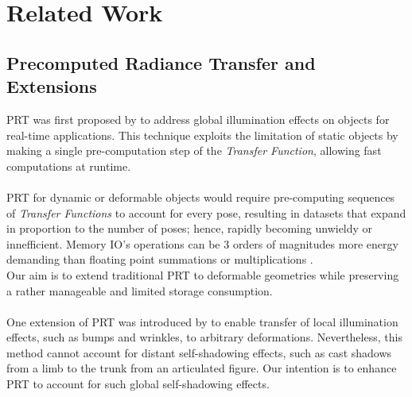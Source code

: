 \section{Related Work}
\subsection*{Precomputed Radiance Transfer and Extensions} 
PRT was first proposed by \cite{sloan2002precomputed} to address global illumination effects on objects for real-time applications. This technique exploits the limitation of static objects by making a single pre-computation step of the \textit{Transfer Function}, allowing fast computations at runtime. \\
\\
PRT for dynamic or deformable objects would require pre-computing sequences of \textit{Transfer Functions} to account for every pose, resulting in datasets that expand in proportion to the number of poses; hence, rapidly becoming unwieldy or innefficient. Memory IO's operations can be 3 orders of magnitudes more energy demanding than floating point summations or multiplications \cite{ComputingEnergy}.\\
Our aim is to extend traditional PRT to deformable geometries while preserving a rather manageable and limited storage consumption.
\\
\\
One extension of PRT was introduced by  \cite{local-deformable-precomputed-radiance-transfer} to enable transfer of local illumination effects, such as bumps and wrinkles, to arbitrary deformations.  Nevertheless, this method cannot account for distant self-shadowing effects, such as cast shadows from a limb to the trunk from an articulated figure. Our intention is to enhance PRT to account for such global self-shadowing effects.\\

